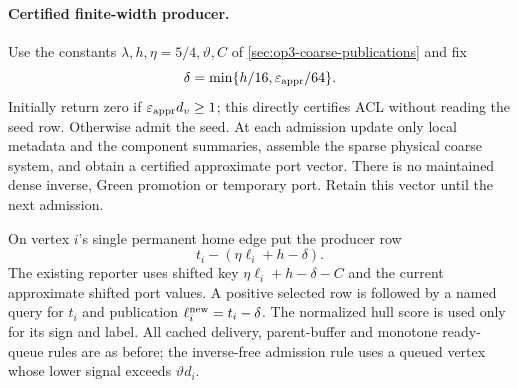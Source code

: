 \paragraph{Certified finite-width producer.}
Use the constants $\lambda,h,\eta=5/4,\vartheta,C$ of
\cref{sec:op3-coarse-publications} and fix
\begin{equation}
 \delta=\min\{h/16,\varepsilon_{\mathrm{appr}}/64\}.
 \label{eq:op3-coarse-delta}
\end{equation}
Initially return zero if $\varepsilon_{\mathrm{appr}} d_v\geq1$; this directly certifies ACL
without reading the seed row. Otherwise admit the seed. At each admission
update only local metadata and the component summaries, assemble the sparse
physical coarse system, and obtain a certified approximate port vector.
There is no maintained dense inverse, Green promotion or temporary port.
Retain this vector until the next admission.

On vertex $i$'s single permanent home edge put the producer row
\begin{equation}
 t_i-(\eta\ell_i+h-\delta).
 \label{eq:op3-approximate-producer-row}
\end{equation}
The existing reporter uses shifted key $\eta\ell_i+h-\delta-C$ and the
current approximate shifted port values. A positive selected row is followed
by a named query for $t_i$ and publication $\ell_i^{\rm new}=t_i-\delta$.
The normalized hull score is used only for its sign and label.
All cached delivery, parent-buffer and monotone ready-queue rules are as
before; the inverse-free admission rule uses a queued vertex whose lower
signal exceeds $\vartheta d_i$.

